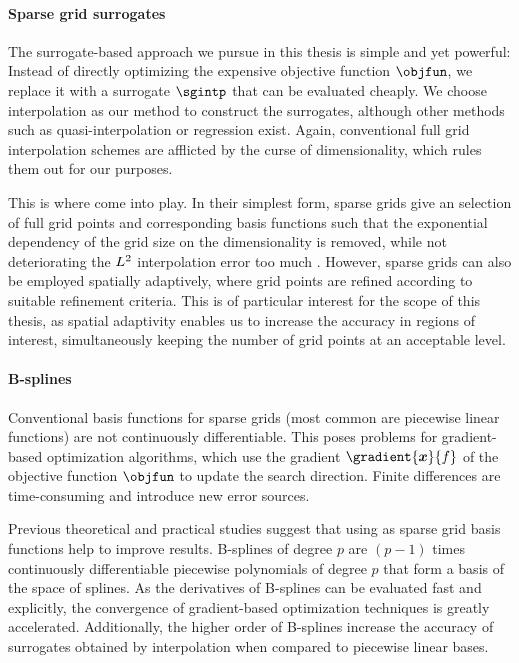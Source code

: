 \paragraph{Sparse grid surrogates}

The surrogate-based approach we pursue in this thesis is simple and
yet powerful:
Instead of directly optimizing the expensive objective function $\objfun$,
we replace it with a surrogate $\sgintp$ that can be evaluated cheaply.
We choose interpolation as our method to construct the surrogates,
although other methods such as quasi-interpolation
\cite{Hoellig13Approximation} or regression \cite{Pflueger10Spatially} exist.
Again, conventional full grid interpolation schemes are afflicted by the
curse of dimensionality, which rules them out for our purposes.

This is where  come into play.
In their simplest form, sparse grids give an  selection of
full grid points and corresponding basis functions such that
the exponential dependency of the grid size on the dimensionality
is removed, while not deteriorating the $L^2$ interpolation error too much
\cite{Bungartz04Sparse}.
However, sparse grids can also be employed spatially adaptively,
where grid points are refined  according to suitable
refinement criteria.
This is of particular interest for the scope of this thesis,
as spatial adaptivity enables us to increase the
accuracy in regions of interest,
simultaneously keeping the number of grid points at an acceptable level.

\paragraph{B-splines}

Conventional basis functions for sparse grids
(most common are piecewise linear functions)
are not continuously differentiable.
This poses problems for gradient-based optimization algorithms,
which use the gradient $\gradient{\*x}{f}$ of the
objective function $\objfun$ to update the search direction.
Finite differences are time-consuming and introduce new error sources.

Previous theoretical \cite{Sickel11Spline} and practical
 studies suggest that
using  as sparse grid basis functions help to improve results.
B-splines of degree $p$ are $(p-1)$ times continuously differentiable
piecewise polynomials of degree $p$ that form a basis of the space of splines.
As the derivatives of B-splines can be evaluated fast and explicitly,
the convergence of gradient-based optimization techniques is
greatly accelerated.
Additionally, the higher order of B-splines increase the accuracy
of surrogates obtained by interpolation
when compared to piecewise linear bases.

